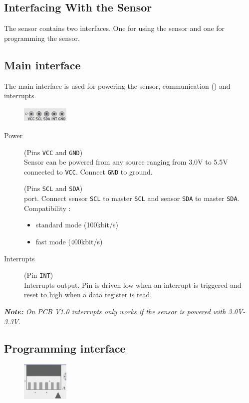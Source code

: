 \begin{multicols}{2}
\section{Interfacing With the Sensor}
The sensor contains two interfaces. One for using the sensor and one for programming the sensor.
\subsection{Main interface}
The main interface is used for powering the sensor, communication (\iic) and interrupts.
\begin{figure}[H]
 \centering
 \includegraphics[width=0.2\textwidth]{../img/J2.png}
\end{figure}

\begin{description}
	\item[Power] (Pins \texttt{VCC} and \texttt{GND}) \\
	Sensor can be powered from any source ranging from 3.0V to 5.5V connected to \texttt{VCC}. Connect \texttt{GND} to ground. 
	
	\item[\iic] (Pins \texttt{SCL} and \texttt{SDA}) \\
	\iic port. Connect sensor \texttt{SCL} to master \texttt{SCL} and sensor \texttt{SDA} to master \texttt{SDA}.\\
	Compatibility : \cite{i2cspec} \cite{microchipDS}
	\begin{itemize}
		\item standard mode (100kbit/s)
		\item fast mode (400kbit/s)
	\end{itemize}
	
	\item[Interrupts] (Pin \texttt{INT}) \\
	Interrupts output. Pin is driven low when an interrupt is triggered and reset to high when a data register is read.
\end{description}
	\textit{\textbf{Note:} On PCB V1.0 interrupts only works if the sensor is powered with 3.0V-3.3V.}


\subsection{Programming interface}
\begin{figure}[H]
 \centering
 \includegraphics[width=0.2\textwidth]{../img/J1.png}
\end{figure}


\end{multicols}
